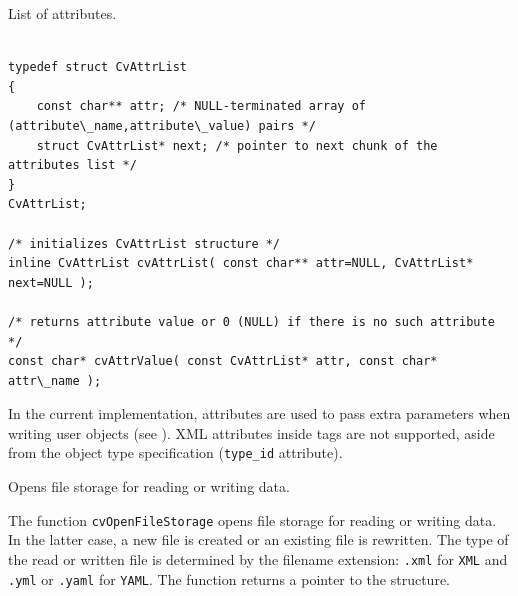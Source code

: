 \label{CvAttrList}

List of attributes.

\begin{lstlisting}

typedef struct CvAttrList
{
    const char** attr; /* NULL-terminated array of (attribute\_name,attribute\_value) pairs */
    struct CvAttrList* next; /* pointer to next chunk of the attributes list */
}
CvAttrList;

/* initializes CvAttrList structure */
inline CvAttrList cvAttrList( const char** attr=NULL, CvAttrList* next=NULL );

/* returns attribute value or 0 (NULL) if there is no such attribute */
const char* cvAttrValue( const CvAttrList* attr, const char* attr\_name );

\end{lstlisting}

In the current implementation, attributes are used to pass extra parameters when writing user objects (see ). XML attributes inside tags are not supported, aside from the object type specification (\texttt{type\_id} attribute).

\label{OpenFileStorage}

Opens file storage for reading or writing data.


\begin{description}
\end{description}

The function \texttt{cvOpenFileStorage} opens file storage for
reading or writing data. In the latter case, a new file is created
or an existing file is rewritten. The type of the read or written file is
determined by the filename extension: \texttt{.xml} for \texttt{XML}
and \texttt{.yml} or \texttt{.yaml} for \texttt{YAML}. The function
returns a pointer to the  structure.

